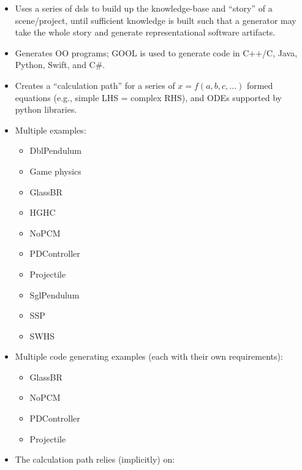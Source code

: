 \begin{itemize}

    \item Uses a series of \acfp{dsl} to build up the knowledge-base and
          ``story'' of a scene/project, until sufficient knowledge is built such
          that a generator may take the whole story and generate
          representational software artifacts.

    \item Generates OO programs; GOOL is used to generate code in C++/C, Java,
          Python, Swift, and C\#.

    \item Creates a ``calculation path'' for a series of $x = f(a,b,c,...)$
          formed equations (e.g., simple LHS = complex RHS), and ODEs supported
          by python libraries.

    \item Multiple examples:
          \begin{itemize}
              \item DblPendulum
              \item Game physics
              \item GlassBR
              \item HGHC
              \item NoPCM
              \item PDController
              \item Projectile
              \item SglPendulum
              \item SSP
              \item SWHS
          \end{itemize}

    \item Multiple code generating examples (each with their own requirements):
          \begin{itemize}
              \item GlassBR
              \item NoPCM
              \item PDController
              \item Projectile
          \end{itemize}

    \item The calculation path relies (implicitly) on:
          \begin{itemize}


\end{itemize}
\end{itemize}
